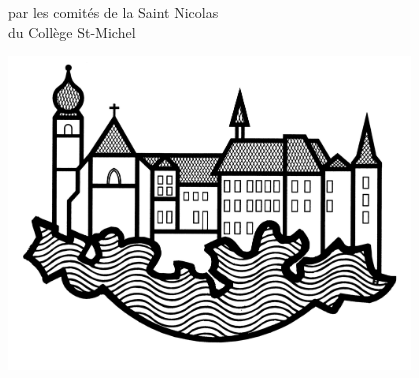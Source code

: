 \begin{center}
{\Huge par les comités de la Saint Nicolas\vspace*{1mm}\\
du Collège St-Michel}
\vspace*{5mm}
\par
\includegraphics[width=0.8\textwidth]{csm.jpg}
\end{center}


\clearpage
\thispagestyle{empty}%
\clearpage
